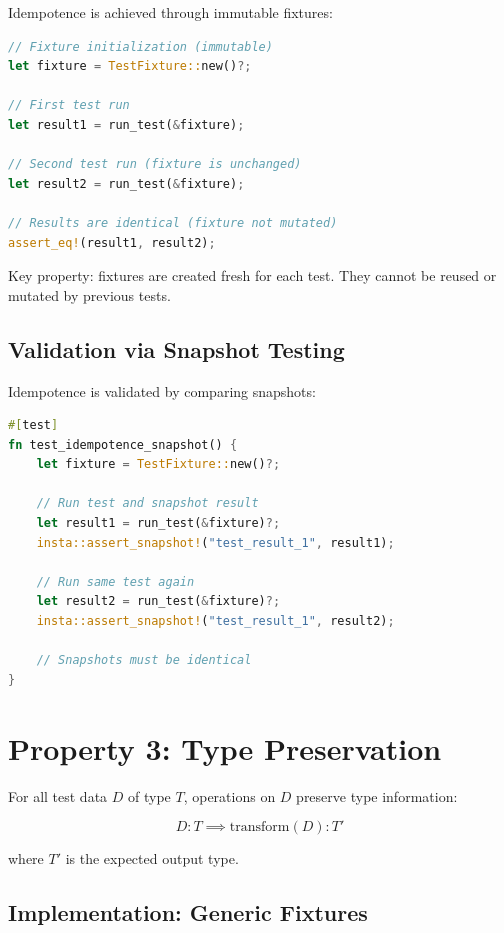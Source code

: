 Idempotence is achieved through immutable fixtures:

\begin{lstlisting}[language=Rust]
// Fixture initialization (immutable)
let fixture = TestFixture::new()?;

// First test run
let result1 = run_test(&fixture);

// Second test run (fixture is unchanged)
let result2 = run_test(&fixture);

// Results are identical (fixture not mutated)
assert_eq!(result1, result2);
\end{lstlisting}

Key property: fixtures are created fresh for each test. They cannot be reused or mutated
by previous tests.

\subsection{Validation via Snapshot Testing}

Idempotence is validated by comparing snapshots:

\begin{lstlisting}[language=Rust]
#[test]
fn test_idempotence_snapshot() {
    let fixture = TestFixture::new()?;

    // Run test and snapshot result
    let result1 = run_test(&fixture)?;
    insta::assert_snapshot!("test_result_1", result1);

    // Run same test again
    let result2 = run_test(&fixture)?;
    insta::assert_snapshot!("test_result_1", result2);

    // Snapshots must be identical
}
\end{lstlisting}

\section{Property 3: Type Preservation}

\begin{theorem}
For all test data $D$ of type $T$, operations on $D$ preserve type information:

\begin{equation}
D : T \implies \text{transform}(D) : T'
\end{equation}

where $T'$ is the expected output type.
\end{theorem}

\subsection{Implementation: Generic Fixtures}

